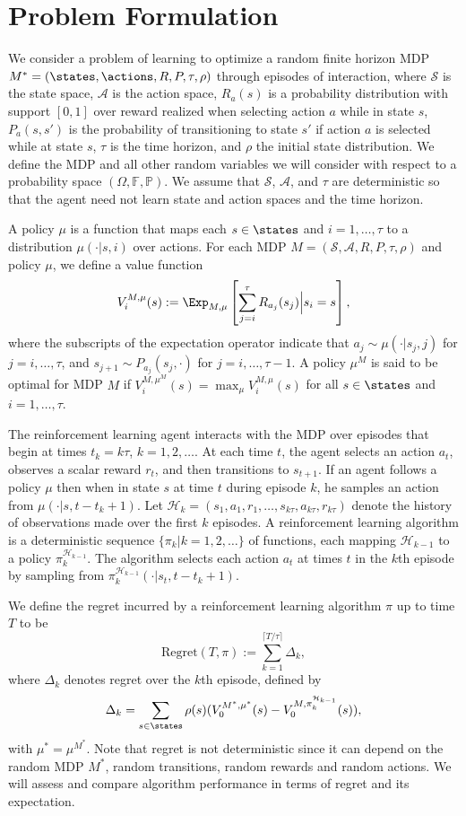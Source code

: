 \section{Problem Formulation}

We consider a problem of learning to optimize a random finite horizon MDP $M^* = (\states, \actions, R, P, \tau, \rho)$ through episodes of interaction, where $\mathcal{S}$ is the state space, $\mathcal{A}$ is the action space, $R_a(s)$ is a probability distribution with support $[0,1]$ over reward realized when selecting action $a$ while in state $s$, $P_a(s,s')$ is the probability of transitioning to state $s'$ if action $a$ is selected while at state $s$, $\tau$ is the time horizon, and $\rho$ the initial state distribution.  
We define the MDP and all other random variables we will consider with respect to a probability space $(\Omega, \mathbb{F}, \mathbb{P})$.  We assume that $\mathcal{S}$, $\mathcal{A}$, and $\tau$ are deterministic so that the agent need not learn state and action spaces and the time horizon.

A policy $\mu$ is a function that maps each $s \in \states$ and $i = 1,\ldots,\tau$ to a distribution $\mu(\cdot | s,i)$ over actions.
For each MDP $M = (\mathcal{S}, \mathcal{A}, R, P, \tau, \rho)$ and policy $\mu$, we define a value function
$$V^{M,\mu}_i(s) := \Exp_{M,\mu}\left[ \sum_{j=i}^\tau R_{a_j}(s_j) \Big| s_i = s \right],$$
where the subscripts of the expectation operator indicate that $a_j \sim \mu(\cdot | s_j, j)$ for $j = i, \ldots, \tau$, and $s_{j+1} \sim P_{a_j}(s_j, \cdot)$ for $j = i, \ldots, \tau-1$.  A policy $\mu^M$ is said to be optimal for MDP $M$ if $V^{M,\mu^M}_i(s) = \max_\mu V^{M,\mu}_i(s)$ for all $s \in \states$ and $i=1,\ldots,\tau$.

The reinforcement learning agent interacts with the MDP over episodes that begin at times $t_k = k \tau$, $k=1,2,\ldots$.
At each time $t$, the agent selects an action $a_t$, observes a scalar reward $r_t$, and then transitions to $s_{t+1}$.
If an agent follows a policy $\mu$ then when in state $s$ at time $t$ during episode $k$, he samples an action from $\mu(\cdot | s, t - t_k + 1)$.
Let $\mathcal{H}_k = (s_1,a_1,r_1,\ldots,s_{k \tau},a_{k\tau},r_{k\tau})$ denote the history of observations made over the first $k$ episodes.  
A reinforcement learning algorithm is a deterministic sequence $\{\pi_k | k = 1, 2, \ldots\}$ of functions, each mapping $\mathcal{H}_{k-1}$ to a policy 
$\pi^{\mathcal{H}_{k-1}}_k$.  
The algorithm selects each action $a_t$ at times $t$ in the $k$th episode by sampling from $\pi^{\mathcal{H}_{k-1}}_k(\cdot | s_t, t - t_k + 1)$.

We define the regret incurred by a reinforcement learning algorithm $\pi$ up to time $T$ to be
$$\text{Regret}(T, \pi) := \sum_{k=1}^{\lceil T/\tau \rceil} \Delta_k,$$
where $\Delta_k$ denotes regret over the $k$th episode, defined by
$$\Delta_k = \sum_{s \in \states} \rho(s) (V^{M^*,\mu^*}_0(s) - V^{M,\pi^{\mathcal{H}_{k-1}}_k}_0(s)),$$
with $\mu^* = \mu^{M^*}$.
Note that regret is not deterministic since it can depend on the random MDP $M^*$, random transitions, random rewards and random actions. We will assess and compare algorithm performance in terms of regret and its expectation.
